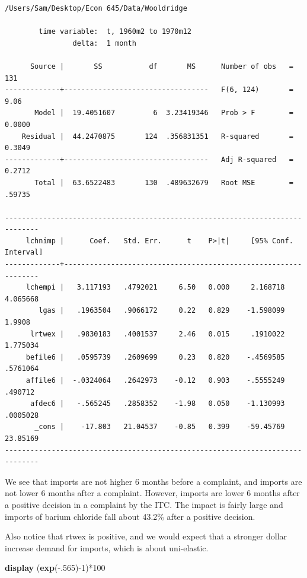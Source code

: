 \documentclass[
]{book}
\newenvironment{Shaded}{\begin{snugshade}}{\end{snugshade}}
\newcommand{\FunctionTok}[1]{\textcolor[rgb]{0.13,0.29,0.53}{\textbf{#1}}}
\newcommand{\KeywordTok}[1]{\textcolor[rgb]{0.13,0.29,0.53}{\textbf{#1}}}
\newcommand{\NormalTok}[1]{#1}
\begin{document}
\begin{verbatim}
/Users/Sam/Desktop/Econ 645/Data/Wooldridge

        time variable:  t, 1960m2 to 1970m12
                delta:  1 month

      Source |       SS           df       MS      Number of obs   =       131
-------------+----------------------------------   F(6, 124)       =      9.06
       Model |  19.4051607         6  3.23419346   Prob > F        =    0.0000
    Residual |  44.2470875       124  .356831351   R-squared       =    0.3049
-------------+----------------------------------   Adj R-squared   =    0.2712
       Total |  63.6522483       130  .489632679   Root MSE        =    .59735

------------------------------------------------------------------------------
     lchnimp |      Coef.   Std. Err.      t    P>|t|     [95% Conf. Interval]
-------------+----------------------------------------------------------------
     lchempi |   3.117193   .4792021     6.50   0.000     2.168718    4.065668
        lgas |   .1963504   .9066172     0.22   0.829    -1.598099      1.9908
      lrtwex |   .9830183   .4001537     2.46   0.015     .1910022    1.775034
     befile6 |   .0595739   .2609699     0.23   0.820    -.4569585    .5761064
     affile6 |  -.0324064   .2642973    -0.12   0.903    -.5555249     .490712
      afdec6 |   -.565245   .2858352    -1.98   0.050    -1.130993    .0005028
       _cons |    -17.803   21.04537    -0.85   0.399    -59.45769    23.85169
------------------------------------------------------------------------------
\end{verbatim}

We see that imports are not higher 6 months before a complaint, and imports
are not lower 6 months after a complaint. However, imports are lower 6 months
after a positive decision in a complaint by the ITC. The impact is fairly large
and imports of barium chloride fall about 43.2\% after a positive decision.

Also notice that rtwex is positive, and we would expect that a stronger dollar
increase demand for imports, which is about uni-elastic.

\begin{Shaded}
\begin{Highlighting}[]
\KeywordTok{display}\NormalTok{ (}\FunctionTok{exp}\NormalTok{({-}.565){-}1)*100}
\end{Highlighting}
\end{Shaded}
\end{document}
